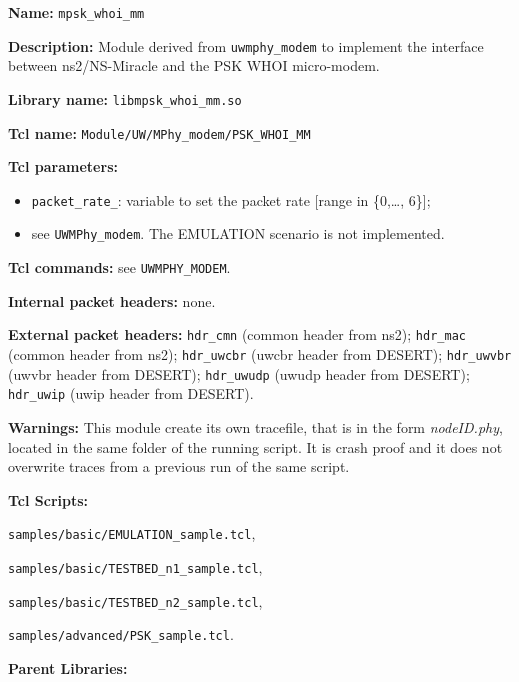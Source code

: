 \begin{description}
   \item {\bf Name:} {\tt mpsk\_whoi\_mm}
   \item {\bf Description:} Module derived from {\tt uwmphy\_modem} to implement the interface between ns2/NS-Miracle and the PSK WHOI micro-modem. 
   \item {\bf Library name:} {\tt libmpsk\_whoi\_mm.so}
   \item {\bf Tcl name:} {\tt Module/UW/MPhy\_modem/PSK\_WHOI\_MM}
   \item {\bf Tcl parameters:} 
         \begin{itemize}
          \item{\tt packet\_rate\_}: variable to set the packet rate [range in \{0,\dots, 6\}];
          \item see {\tt UWMPhy\_modem}. The EMULATION scenario is not implemented.
         \end{itemize}
   \item {\bf Tcl commands:} see {\tt UWMPHY\_MODEM}.
   \item {\bf Internal packet headers:} none.
   \item {\bf External packet headers:} {\tt hdr\_cmn} (common header from ns2); {\tt hdr\_mac} (common header from ns2); {\tt hdr\_uwcbr} (uwcbr header from DESERT); {\tt hdr\_uwvbr} (uwvbr header from DESERT); {\tt hdr\_uwudp} (uwudp header from DESERT); {\tt hdr\_uwip} (uwip header from DESERT).
   \item {\bf Warnings:} This module create its own tracefile, that is in the form \textit{nodeID.phy}, located in the same folder of the running script. It is crash proof and it does not overwrite traces from a previous run of the same script.
   \item {\bf Tcl Scripts:} 
   	\begin{description}
		\item {\tt samples/basic/EMULATION\_sample.tcl},
		\item {\tt samples/basic/TESTBED\_n1\_sample.tcl}, 
		\item {\tt samples/basic/TESTBED\_n2\_sample.tcl},
		\item {\tt samples/advanced/PSK\_sample.tcl}.
	  \end{description}
   \item {\bf Parent Libraries:}
\end{description}

\vspace{1 cm}

